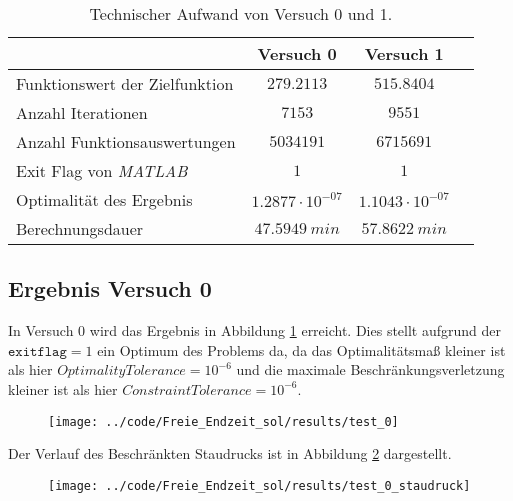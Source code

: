 \begin{table}[H]
    \centering
    \caption{Technischer Aufwand von Versuch 0 und 1.}\label{tab:Versuch_TA}
    \begin{tabularx}{.9\textwidth}{Zccc}
        \toprule
         & \textbf{Versuch 0} & \textbf{Versuch 1} \\
        \midrule
        Funktionswert der Zielfunktion & $279.2113$ & $515.8404$ \\
        Anzahl Iterationen & $7153$ & $9551$ \\
        Anzahl Funktionsauswertungen & $5034191$ & $6715691$ \\
        Exit Flag von \textit{MATLAB} & $1$ & $1$ \\
        Optimalität des Ergebnis & $1.2877 \cdot 10^{-07}$ & $1.1043 \cdot 10^{-07}$ \\
        Berechnungsdauer & $47.5949 \ min$ & $57.8622 \ min$ \\
        \bottomrule
    \end{tabularx}
\end{table}




\subsection{Ergebnis Versuch 0}\label{kap:Versuch0_OptTf}
In Versuch 0 wird das Ergebnis in Abbildung \ref{img:test_0_OptTf} erreicht. Dies stellt aufgrund der $\texttt{exitflag} = 1$ ein Optimum des Problems da, da das Optimalitätsmaß kleiner ist als hier $OptimalityTolerance = 10^{-6}$ und die maximale Beschränkungsverletzung kleiner ist als hier $ConstraintTolerance = 10^{-6}$.
\begin{figure}[H]
\begin{center}
\texttt{[image: ../code/Freie\_Endzeit\_sol/results/test\_0]}
 \label{img:test_0_OptTf}
\end{center}
\end{figure}
Der Verlauf des Beschränkten Staudrucks ist in Abbildung \ref{img:test_0_staudruck_OptTf} dargestellt.
\begin{figure}[H]
\begin{center}
\texttt{[image: ../code/Freie\_Endzeit\_sol/results/test\_0\_staudruck]}
 \label{img:test_0_staudruck_OptTf}
\end{center}
\end{figure}





